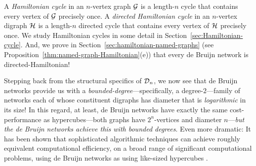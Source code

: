 \smallskip

 

A {\it Hamiltonian cycle} in an $n$-vertex graph $\mbox{$\cal G$}$ is a length-$n$ cycle that contains every vertex of $\mbox{$\cal G$}$ precisely once.  A {\it directed Hamiltonian cycle} in an $n$-vertex digraph $\mbox{$\cal H$}$ is a length-$n$ directed cycle that contains every vertex of $\mbox{$\cal H$}$ precisely once.  We study Hamiltonian cycles in some detail in Section~\ref{sec:Hamiltonian-cycle}.  And, we prove in Section~\ref{sec:hamiltonian-named-graphs} (see Proposition~\ref{thm:named-graph-Hamiltonian}(e)) that every de Bruijn network is directed-Hamiltonian!

\bigskip

Stepping back from the structural specifics of $\mbox{$\cal D$}_n$, we now see that de Bruijn networks provide us with a {\em bounded-degree}---specifically, a degree-$2$---family of networks each of whose constituent digraphs has diameter that is {\em logarithmic} in its size!  In this regard, at least, de Bruijn networks have exactly the same cost-performance as hypercubes---both graphs have $2^n$-vertices and diameter $n$---{\em but the de Bruijn networks achieve this with bounded degrees}.  Even more dramatic:  It has been shown that sophisticated algorithmic techniques can achieve roughly equivalent computational efficiency, on a broad range of significant computational problems, using de Bruijn networks as using like-sized hypercubes \cite{AnnexsteinBR90, BermondP89, Ullman84}.

\bigskip

\noindent {}

